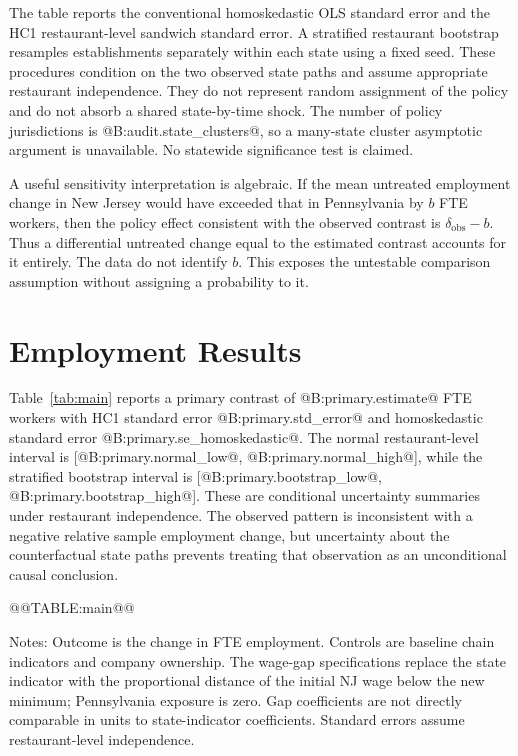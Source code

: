 \documentclass[11pt]{article}
\begin{document}
The table reports the conventional homoskedastic OLS standard error and the HC1 restaurant-level sandwich standard error. A stratified restaurant bootstrap resamples establishments separately within each state using a fixed seed. These procedures condition on the two observed state paths and assume appropriate restaurant independence. They do not represent random assignment of the policy and do not absorb a shared state-by-time shock. The number of policy jurisdictions is @B:audit.state_clusters@, so a many-state cluster asymptotic argument is unavailable. No statewide significance test is claimed. %

A useful sensitivity interpretation is algebraic. If the mean untreated employment change in New Jersey would have exceeded that in Pennsylvania by $b$ FTE workers, then the policy effect consistent with the observed contrast is $\delta_{\mathrm{obs}}-b$. Thus a differential untreated change equal to the estimated contrast accounts for it entirely. The data do not identify $b$. This exposes the untestable comparison assumption without assigning a probability to it. %

\section{Employment Results}
Table~\ref{tab:main} reports a primary contrast of @B:primary.estimate@ FTE workers with HC1 standard error @B:primary.std_error@ and homoskedastic standard error @B:primary.se_homoskedastic@. The normal restaurant-level interval is [@B:primary.normal_low@, @B:primary.normal_high@], while the stratified bootstrap interval is [@B:primary.bootstrap_low@, @B:primary.bootstrap_high@]. These are conditional uncertainty summaries under restaurant independence. The observed pattern is inconsistent with a negative relative sample employment change, but uncertainty about the counterfactual state paths prevents treating that observation as an unconditional causal conclusion. %

\begin{table}[htbp]\centering
\caption{Employment-change regressions}\label{tab:main}
@@TABLE:main@@
\begin{minipage}{.95\linewidth}\small\medskip
Notes: Outcome is the change in FTE employment. Controls are baseline chain indicators and company ownership. The wage-gap specifications replace the state indicator with the proportional distance of the initial NJ wage below the new minimum; Pennsylvania exposure is zero. Gap coefficients are not directly comparable in units to state-indicator coefficients. Standard errors assume restaurant-level independence.
\end{minipage}
\end{table}
\end{document}
